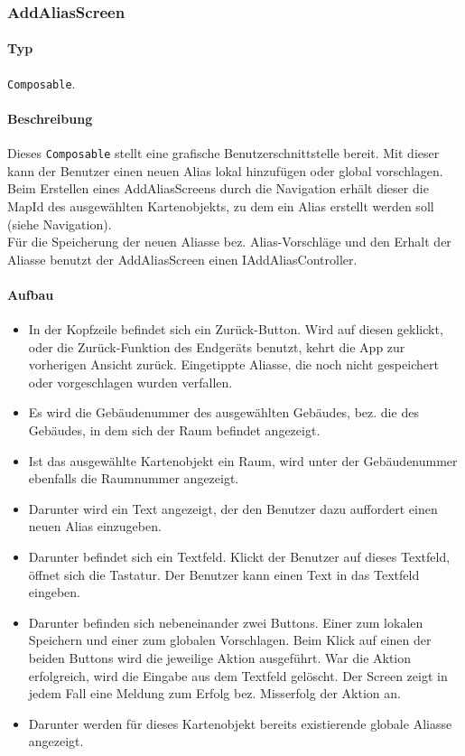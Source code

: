\subsubsection{AddAliasScreen}
\paragraph*{Typ}
\texttt{Composable}.
\paragraph*{Beschreibung}
Dieses \texttt{Composable} stellt eine grafische Benutzerschnittstelle bereit.
Mit dieser kann der Benutzer einen neuen Alias lokal hinzufügen oder global vorschlagen.\\
Beim Erstellen eines AddAliasScreens durch die Navigation erhält dieser die MapId 
des ausgewählten Kartenobjekts, zu dem ein Alias erstellt werden soll (siehe Navigation).\\
Für die Speicherung der neuen Aliasse bez. Alias-Vorschläge und den Erhalt der Aliasse benutzt 
der AddAliasScreen einen IAddAliasController.

\paragraph*{Aufbau}
\begin{itemize}
    \item In der Kopfzeile befindet sich ein Zurück-Button. Wird auf diesen geklickt, oder die Zurück-Funktion des Endgeräts benutzt, 
    kehrt die App zur vorherigen Ansicht zurück. Eingetippte Aliasse, die noch nicht gespeichert oder vorgeschlagen wurden verfallen.
    \item Es wird die Gebäudenummer des ausgewählten Gebäudes, bez. die des Gebäudes, in dem sich der Raum befindet angezeigt.
    \item Ist das ausgewählte Kartenobjekt ein Raum, wird unter der Gebäudenummer ebenfalls die Raumnummer angezeigt.
    \item Darunter wird ein Text angezeigt, der den Benutzer dazu auffordert einen neuen Alias einzugeben.
    \item Darunter befindet sich ein Textfeld. Klickt der Benutzer auf dieses Textfeld, öffnet sich die Tastatur. 
    Der Benutzer kann einen Text in das Textfeld eingeben.
    \item Darunter befinden sich nebeneinander zwei Buttons. Einer zum lokalen Speichern und einer zum globalen Vorschlagen. 
    Beim Klick auf einen der beiden Buttons wird die jeweilige Aktion ausgeführt. War die Aktion erfolgreich, wird die Eingabe 
    aus dem Textfeld gelöscht. Der Screen zeigt in jedem Fall eine Meldung zum Erfolg bez. Misserfolg der Aktion an.
    \item Darunter werden für dieses Kartenobjekt bereits existierende globale Aliasse angezeigt.
\end{itemize}
